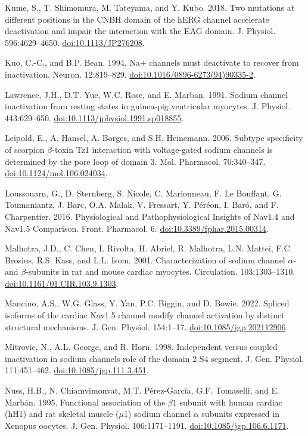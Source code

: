 \begin{hangparas}{.25in}{1}
Kume, S., T. Shimomura, M. Tateyama, and Y. Kubo. 2018. Two mutations at different positions in the CNBH domain of the hERG channel accelerate deactivation and impair the interaction with the EAG domain. J. Physiol. 596:4629–4650. \url{doi:10.1113/JP276208}.

Kuo, C.-C., and B.P. Bean. 1994. Na+ channels must deactivate to recover from inactivation. Neuron. 12:819–829. \url{doi:10.1016/0896-6273(94)90335-2}.

Lawrence, J.H., D.T. Yue, W.C. Rose, and E. Marban. 1991. Sodium channel inactivation from resting states in guinea-pig ventricular myocytes. J. Physiol. 443:629–650. \url{doi:10.1113/jphysiol.1991.sp018855}.

Leipold, E., A. Hansel, A. Borges, and S.H. Heinemann. 2006. Subtype specificity of scorpion $\beta$-toxin Tz1 interaction with voltage-gated sodium channels is determined by the pore loop of domain 3. Mol. Pharmacol. 70:340–347. \url{doi:10.1124/mol.106.024034}.

Loussouarn, G., D. Sternberg, S. Nicole, C. Marionneau, F. Le Bouffant, G. Toumaniantz, J. Barc, O.A. Malak, V. Fressart, Y. Péréon, I. Baró, and F. Charpentier. 2016. Physiological and Pathophysiological Insights of Nav1.4 and Nav1.5 Comparison. Front. Pharmacol. 6. \url{doi:10.3389/fphar.2015.00314}.

Malhotra, J.D., C. Chen, I. Rivolta, H. Abriel, R. Malhotra, L.N. Mattei, F.C. Brosius, R.S. Kass, and L.L. Isom. 2001. Characterization of sodium channel $\alpha$- and $\beta$-subunits in rat and mouse cardiac myocytes. Circulation. 103:1303–1310. \url{doi:10.1161/01.CIR.103.9.1303}.

Mancino, A.S., W.G. Glass, Y. Yan, P.C. Biggin, and D. Bowie. 2022. Spliced isoforms of the cardiac Nav1.5 channel modify channel activation by distinct structural mechanisms. J. Gen. Physiol. 154:1–17. \url{doi:10.1085/jgp.202112906}.

Mitrovic, N., A.L. George, and R. Horn. 1998. Independent versus coupled inactivation in sodium channels role of the domain 2 S4 segment. J. Gen. Physiol. 111:451–462. \url{doi:10.1085/jgp.111.3.451}.

Nuss, H.B., N. Chiamvimonvat, M.T. Pérez-García, G.F. Tomaselli, and E. Marbán. 1995. Functional association of the $\beta1$ subunit with human cardiac (hH1) and rat skeletal muscle ($\mu$1) sodium channel $\alpha$ subunits expressed in Xenopus oocytes. J. Gen. Physiol. 106:1171–1191. \url{doi:10.1085/jgp.106.6.1171}.


\end{hangparas}
